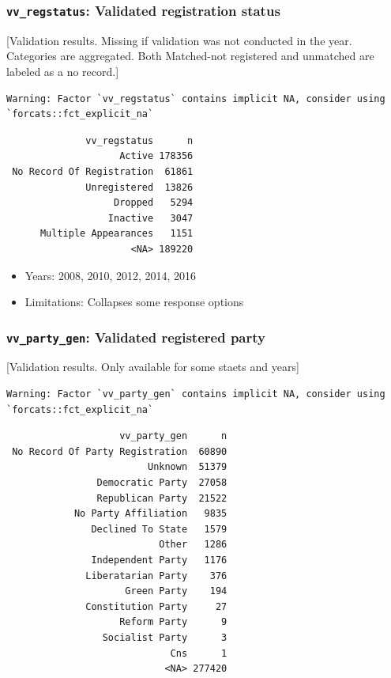 \documentclass[10pt,article,oneside]{memoir}
\theoremstyle{definition}
\begin{document}
\hypertarget{vv_regstatus-validated-registration-status}{%
\subsubsection{\texorpdfstring{\texttt{vv\_regstatus}: Validated
registration
status}{vv\_regstatus: Validated registration status}}\label{vv_regstatus-validated-registration-status}}

{[}Validation results. Missing if validation was not conducted in the
year. Categories are aggregated. Both Matched-not registered and
unmatched are labeled as a no record.{]}

\begin{verbatim}
Warning: Factor `vv_regstatus` contains implicit NA, consider using
`forcats::fct_explicit_na`
\end{verbatim}

\begin{verbatim}
              vv_regstatus      n
                    Active 178356
 No Record Of Registration  61861
              Unregistered  13826
                   Dropped   5294
                  Inactive   3047
      Multiple Appearances   1151
                      <NA> 189220
\end{verbatim}

\begin{itemize}
\tightlist
\item
  Years: 2008, 2010, 2012, 2014, 2016
\item
  Limitations: Collapses some response options
\end{itemize}

\hypertarget{vv_party_gen-validated-registered-party}{%
\subsubsection{\texorpdfstring{\texttt{vv\_party\_gen}: Validated
registered
party}{vv\_party\_gen: Validated registered party}}\label{vv_party_gen-validated-registered-party}}

{[}Validation results. Only available for some staets and years{]}

\begin{verbatim}
Warning: Factor `vv_party_gen` contains implicit NA, consider using
`forcats::fct_explicit_na`
\end{verbatim}

\begin{verbatim}
                    vv_party_gen      n
 No Record Of Party Registration  60890
                         Unknown  51379
                Democratic Party  27058
                Republican Party  21522
            No Party Affiliation   9835
               Declined To State   1579
                           Other   1286
               Independent Party   1176
              Liberatarian Party    376
                     Green Party    194
              Constitution Party     27
                    Reform Party      9
                 Socialist Party      3
                             Cns      1
                            <NA> 277420
\end{verbatim}
\end{document}
